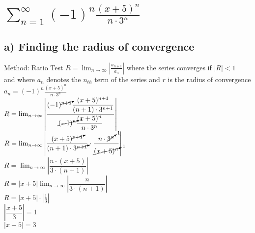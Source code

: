 \documentclass{article}
\begin{document}
\section{$ \sum_{n=1}^{\infty}  (-1)^n \frac{(x+5)^n}{n\cdot 3^n}$}
\begin{multicols*}{2}
    

\subsection*{a) Finding the radius of convergence}
Method: Ratio Test $R =  \lim_{n\to\infty}\left| \frac{a_{n+1}}{a_n} \right|$ where the series converges if $|R|<1$
\\[0.1in]and where $a_n$ denotes the $n_{th}$ term of the series and $r$ is the radius of convergence
\\[0.1in] $a_n= (-1)^n \frac{(x+5)^n}{n\cdot 3^n}$
\\[0.1in]$ R=\lim_{n \to \infty}  \left| \dfrac{(-1)^{\cancelto{}{n+1}} \dfrac{(x+5)^{n+1}}{(n+1)\cdot 3^{n+1}}}{\cancelto{1}{(-1)^n} \dfrac{(x+5)^n}{n\cdot 3^n}}\right|$
\\[0.1in]$ R=\lim_{n \to \infty}  \left| \dfrac{(x+5)^{\cancelto{}{n+1}}}{(n+1)\cdot 3^{\cancelto{}{n+1}}}\cdot \dfrac{n\cdot \cancelto{1}{3^n}}{\cancelto{1}{(x+5)^n}}\right|$
\\[0.1in]$ R=\lim_{n \to \infty}  \left| \dfrac{n\cdot(x+5)}{3\cdot(n+1)}\right|$
\\[0.1in]$ R =\left|x+5\right| \lim_{n \to \infty}  \left| \dfrac{n}{3\cdot(n+1)}\right|$
\\[0.1in]$ R =\left|{x+5}\right| \cdot \left|\frac{1}{3}\right|$
\\[0.1in]$ \left|\dfrac{x+5}{3}\right| = 1$
\\[0.1in]$ \left|{x+5}\right| = 3$
\\[0.1in]
\\[2in]
\\
\vfill\null
\columnbreak

\end{multicols*}
\end{document}
